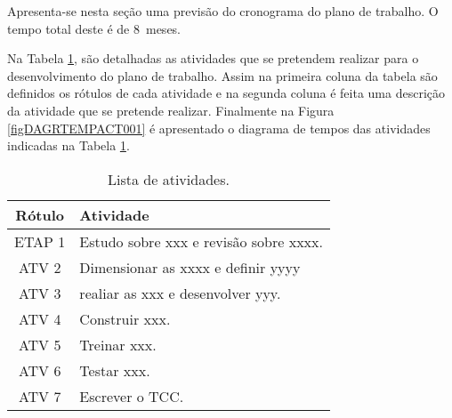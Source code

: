 \newcommand{\DuracionPlanoMeses}{8}

\newcommand{\AtvAlgRotI}{Estudo sobre xxx e revisão sobre xxxx.}
\newcommand{\AtvAlgRotII}{Dimensionar as xxxx e definir yyyy}
\newcommand{\AtvAlgRotIII}{realiar as xxx e desenvolver yyy.}
\newcommand{\AtvAlgRotIV}{Construir xxx.}
\newcommand{\AtvAlgRotV}{Treinar xxx.}
\newcommand{\AtvAlgRotVI}{Testar xxx.}
\newcommand{\AtvAlgRotVII}{Escrever o TCC.}

\newcommand{\RTLAtvAlgRotI}{ETAP 1} %
\newcommand{\RTLAtvAlgRotII}{ATV 2} %
\newcommand{\RTLAtvAlgRotIII}{ATV 3} %
\newcommand{\RTLAtvAlgRotIV}{ATV 4} %
\newcommand{\RTLAtvAlgRotV}{ATV 5} %
\newcommand{\RTLAtvAlgRotVI}{ATV 6} %
\newcommand{\RTLAtvAlgRotVII}{ATV 7} %

Apresenta-se nesta seção uma previsão do cronograma do plano de trabalho. O tempo total deste é de \DuracionPlanoMeses\ meses.

Na Tabela \ref{Tab1}, são detalhadas as atividades que se pretendem realizar para o desenvolvimento do plano de trabalho. 
Assim na primeira coluna da tabela são definidos os rótulos de cada atividade e na segunda coluna é feita uma descrição da atividade que se pretende realizar. Finalmente na Figura \ref{figDAGRTEMPACT001} é apresentado o diagrama de tempos das atividades indicadas na Tabela \ref{Tab1}.

\begin{table}[!htbp]
\begin{center}\begin{tabular}{c|p{14.00cm}}
\hline
Rótulo  & Atividade \\ 
\hline
\hline
\RTLAtvAlgRotI & \AtvAlgRotI \\ 
\hline 
\RTLAtvAlgRotII & \AtvAlgRotII \\ 
\hline 
\RTLAtvAlgRotIII & \AtvAlgRotIII \\ 
\hline
\RTLAtvAlgRotIV & \AtvAlgRotIV \\ 
\hline
\RTLAtvAlgRotV & \AtvAlgRotV \\
\hline
\RTLAtvAlgRotVI & \AtvAlgRotVI \\
\hline
\hline
\RTLAtvAlgRotVII & \AtvAlgRotVII \\
\hline 
\end{tabular}
\end{center}
\caption{
\footnotesize
Lista de atividades. 
}
\label{Tab1}
\end{table}


